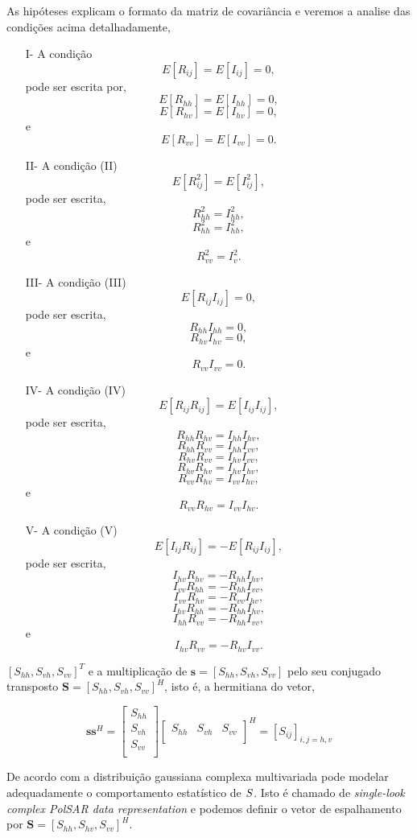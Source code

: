 As hipóteses explicam o formato da matriz de covariância e veremos a analise das condições acima detalhadamente,
\begin{itemize}
	\item[I-] A condição $$E[R_{ij}]=E[I_{ij}]=0,$$ pode ser escrita por, 
	$$E[R_{hh}]=E[I_{hh}]=0,$$ 
	$$E[R_{hv}]=E[I_{hv}]=0,$$ 
  e $$E[R_{vv}]=E[I_{vv}]=0.$$	                               
	\item[II-] A condição (II) $$E[R_{ij}^2]=E[I_{ij}^2],$$ pode ser escrita,      $$R_{hh}^2=I_{hh}^2,$$ 
	$$R_{hh}^2=I_{hh}^2,$$ 
	e $$R_{vv}^2=I_{v}^2.$$
	\item[III-]A condição (III) $$E[R_{ij}I_{ij}]=0,$$ pode ser escrita, $$R_{hh}I_{hh}=0,
$$ $$R_{hv}I_{hv}=0,$$
e $$R_{vv}I_{vv}=0.$$ 
	\item[IV-] A condição (IV) $$E[R_{ij}R_{ij}]=E[I_{ij}I_{ij}],$$ pode ser escrita, $$R_{hh}R_{hv}=I_{hh}I_{hv},$$
	     $$R_{hh}R_{vv}=I_{hh}I_{vv},$$
	     $$R_{hv}R_{vv}=I_{hv}I_{vv},$$
	     $$R_{hv}R_{hv}=I_{hv}I_{hv},$$ 
	     $$R_{vv}R_{hv}=I_{vv}I_{hv},$$
	  e  $$R_{vv}R_{hv}=I_{vv}I_{hv}.$$ 
	\item[V-] A condição (V) 
	$$E[I_{ij}R_{ij}]=-E[R_{ij}I_{ij}],$$ pode ser escrita,
    $$I_{hv}R_{hv}=-R_{hh}I_{hv},$$
    $$I_{vv}R_{hh}=-R_{hh}I_{vv},$$
    $$I_{vv}R_{hv}=-R_{vv}I_{hv},$$
    $$I_{hv}R_{hh}=-R_{hh}I_{hv},$$
    $$I_{hh}R_{vv}=-R_{hh}I_{vv},$$
  e $$I_{hv}R_{vv}=-R_{hv}I_{vv}.$$ 
\end{itemize}
$[S_{hh},S_{vh},S_{vv}]^T$ e a multiplicação de $\mathbf{s}=[S_{hh},S_{vh},S_{vv}]$ pelo seu conjugado transposto $\mathbf{S}=[S_{hh},S_{vh},S_{vv}]^H$, isto é, a hermitiana do vetor, 

\begin{equation}
\mathbf{s}\mathbf{s}^H = \left[
\begin{array}{c}
	S_{hh}      \\
        S_{vh}     \\
	S_{vv}      \\
\end{array}
\right]
\left[
\begin{array}{ccc}
	S_{hh}  & S_{vh}  & S_{vv}      \\
\end{array}
\right]^H = \left[S_{ij} \right]_{i,j=h,v}
\end{equation}

De acordo com \cite{good} a distribuição gaussiana complexa multivariada pode modelar adequadamente o comportamento estatístico de $\boldmath S$. Isto é chamado de {\it single-look complex PolSAR data representation} e podemos definir o vetor de espalhamento por $\mathbf{S}=[S_{hh},S_{hv},S_{vv}]^H$. 

